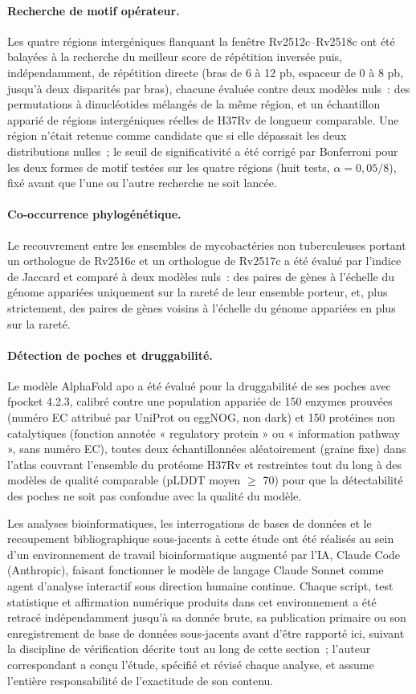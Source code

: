 \documentclass[11pt,a4paper]{article}
\begin{document}
\paragraph{Recherche de motif opérateur.} Les quatre régions intergéniques flanquant la fenêtre
Rv2512c--Rv2518c ont été balayées à la recherche du meilleur score de répétition inversée puis,
indépendamment, de répétition directe (bras de 6 à 12 pb, espaceur de 0 à 8 pb, jusqu'à deux
disparités par bras), chacune évaluée contre deux modèles nuls~: des permutations à dinucléotides
mélangés de la même région, et un échantillon apparié de régions intergéniques réelles de H37Rv de
longueur comparable. Une région n'était retenue comme candidate que si elle dépassait les deux
distributions nulles~; le seuil de significativité a été corrigé par Bonferroni pour les deux
formes de motif testées sur les quatre régions (huit tests, $\alpha=0,05/8$), fixé avant que l'une
ou l'autre recherche ne soit lancée.

\paragraph{Co-occurrence phylogénétique.} Le recouvrement entre les ensembles de mycobactéries non
tuberculeuses portant un orthologue de Rv2516c et un orthologue de Rv2517c a été évalué par
l'indice de Jaccard et comparé à deux modèles nuls~: des paires de gènes à l'échelle du génome
appariées uniquement sur la rareté de leur ensemble porteur, et, plus strictement, des paires de
gènes voisins à l'échelle du génome appariées en plus sur la rareté.

\paragraph{Détection de poches et druggabilité.} Le modèle AlphaFold apo a été évalué pour la
druggabilité de ses poches avec fpocket 4.2.3, calibré contre une population appariée de 150
enzymes prouvées (numéro EC attribué par UniProt ou eggNOG, non dark) et 150 protéines non
catalytiques (fonction annotée « regulatory protein » ou « information pathway », sans numéro EC),
toutes deux échantillonnées aléatoirement (graine fixe) dans l'atlas couvrant l'ensemble du
protéome H37Rv et restreintes tout du long à des modèles de qualité comparable (pLDDT moyen
$\geq$ 70) pour que la détectabilité des poches ne soit pas confondue avec la qualité du modèle.

Les analyses bioinformatiques, les interrogations de bases de données et le recoupement
bibliographique sous-jacents à cette étude ont été réalisés au sein d'un environnement de travail
bioinformatique augmenté par l'IA, Claude Code (Anthropic), faisant fonctionner le modèle de
langage Claude Sonnet comme agent d'analyse interactif sous direction humaine continue. Chaque
script, test statistique et affirmation numérique produits dans cet environnement a été retracé
indépendamment jusqu'à sa donnée brute, sa publication primaire ou son enregistrement de base de
données sous-jacents avant d'être rapporté ici, suivant la discipline de vérification décrite tout
au long de cette section~; l'auteur correspondant a conçu l'étude, spécifié et révisé chaque
analyse, et assume l'entière responsabilité de l'exactitude de son contenu.
\end{document}
